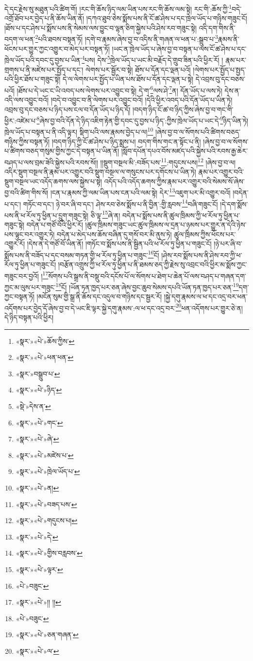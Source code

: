 དེ་དང་རྗེས་སུ་མཐུན་པའི་ཚིག་གོ། །རང་གི་ཆོས་ཉིད་ལམ་ཡིན་པས་རང་གི་ཆོས་ལམ་སྟེ། རང་གི་:ཆོས་ཀྱི་\footnote{«སྣར་»«པེ་»ཆོས་ཀྱིས་}བདེ་འགྲོ་ཐོབ་པར་བྱེད་པ་ནི་ཆོས་ཡིན་ནོ། །དཀའ་ཐུབ་ཅེས་སྨོས་པས་ནི་ངོ་ཚ་ཤེས་པ་དང་ཁྲེལ་ཡོད་པ་གཉིས་གཟུང་ངོ། །ཐོས་པ་དང་ཤེས་པ་སྨོས་པས་ནི་སེམས་ལས་བྱུང་བ་ལྷན་ཅིག་སྐྱེས་པའི་ཤེས་རབ་གཟུང་སྟེ། འདི་དག་གིས་ནི་བདག་ལ་ཕན་\footnote{«སྣར་»«པེ་»ཕན་ཕན་}པའི་ཐབས་བསྟན་ཏོ། །དགེ་བ་རྣམས་ཞེས་བྱ་བ་འདིས་ནི་གཞན་ལ་ཕན་པ་:སྒྲུབ་པ་\footnote{«སྣར་»བསྒྲུབ་པ་}རྣམས་ནི་ཕོངས་པར་གྱུར་ཀྱང་འགྱུར་བ་མེད་པར་བསྟན་ཏོ། །ཡང་ན་ཁྲེལ་ཡོད་པ་ཞེས་བྱ་བ་བསྟན་པ་ལས་ངོ་ཚ་ཤེས་པ་དང་ཁྲེལ་ཡོད་པའི་དབང་དུ་བྱས་པ་ཡིན་\footnote{«སྣར་»«པེ་»ཉིད་}པས། དེས་\footnote{«སྡེ་»དེས་ན་}ཁྲེལ་ཡོད་པ་ཡང་མི་བརྗོད་དེ་གྲུབ་ཟིན་པའི་ཕྱིར་རོ། །
རྣམ་པར་གྲགས་པ་ནི་མཛེས་པར་སྤྱོད་པ་དང་། ལེགས་པར་སྦྱོར་བ་སྟེ། ཐོས་པ་དོན་དང་ལྡན་པའོ། །ལེགས་པར་སྤྱོད་པ་སྤྱད་པའི་ཕྱིར་ཐོས་པ་གཟུང་སྟེ། དེ་ལ་ལེགས་པར་སྤྱོད་པ་ཡིན་པས་ཐོས་པ་དོན་དང་ལྡན་པ་སྟེ། དེ་འབྲས་བུ་དང་བཅས་པའོ། །ཐོས་པ་དེ་ཡང་ང་ཡི་འབད་པས་ལེགས་པར་འབྱུང་བ་སྟེ། དེ་ག་\footnote{«སྣར་»«པེ་»གང་}ལས་ཤེ་\footnote{«སྣར་»«པེ་»ཞེ་}ན། དོན་ཡོད་པ་ལས་ཏེ། དེས་ན་འདི་ལས་འབྱུང་བའོ། །བདེ་བ་འབྱུང་བ་ནི་ལེགས་པར་འབྱུང་བའོ། །དེའི་ཕྱིར་འབད་པའི་དོན་ཡོད་པ་ཡིན་ཏེ། འབྲས་བུ་དང་བཅས་པ་ཉིད་པས་ངལ་བ་དོན་ཡོད་པ་ཉིད་དོ། །བདག་ཉིད་ངོ་ཚ་བ་ཉིད་ཀྱིས་ཞེས་བྱ་བ་གང་གི་ཕྱིར་:འཛེམ་པ་\footnote{«སྣར་»«པེ་»མཛེས་པ་}ཞེས་བྱ་བའི་དོན་དེ་ཉིད་འཇིག་རྟེན་གྱི་དབང་དུ་བྱས་པ་ཉིད་:ཀྱིས་ཁྲེལ་ཡོད་པ་ཡང་དེ་\footnote{«སྣར་»«པེ་»ཁྲེལ་ཡོད་པ་}ཉིད་ཡིན་ཏེ། ཁྲེལ་ཡོད་པ་བསྟན་པ་ནི་འདི་ལྟར། སྡིག་པའི་ལས་རྣམས་བྱེད་པ་ལ།\footnote{«སྣར་»«པེ་»ན།} །ཞེས་བྱ་བ་ལ་སོགས་པའི་ཚིགས་བཅད་གཉིས་ཀྱིས་བསྟན་ཏོ། །བདག་ཉིད་ཀྱི་ངོ་ཚ་ཤེས་པ་ཉིད་སྨྲས་པ། བདག་གིས་གང་ན་སྟོང་པ་ནི། །ཞེས་བྱ་བ་ལ་སོགས་པ་ཚིགས་བཅད་གསུམ་གྱིས་ཀྱང་དེ་བསྟན་པ་ཡིན་ནོ། །སློབ་དཔོན་དཔའ་བོས་མཛད་པའི་སྐྱེས་པའི་རབས་རྒྱ་ཆེར་བཤད་པ་ལས་བྲམ་ཟེའི་སྐྱེས་པའི་རབས་སོ།། །།སྡུག་བསྔལ་མི་:བཟོད་པས་\footnote{«སྣར་»«པེ་»བཟད་པས་}:གདུངས་པས།\footnote{«སྣར་»«པེ་»གདུངས་པ།} །ཞེས་བྱ་བ་ལ། འདིར་སྡུག་བསྔལ་ནི་རྣམ་པར་འགྱུར་བའི་སྡུག་བསྔལ་ལ་གསུངས་པར་དགོངས་པ་ཡིན་ཏེ། རྣམ་པར་འགྱུར་བའི་སྡུག་བསྔལ་ཡང་འདོད་ཆགས་ལས་སྐྱེས་པ་སྟེ། འདོད་པའི་འདོད་ཆགས་ཀྱིས་རྣམ་པར་འགྱུར་བའི་སེམས་སོ་ཞེས་བྱ་བའི་ཚིག་གིས་སོ། །ངན་པ་རྣམས་ཀྱི་ལམ་ཡིན་པས་ངན་པའི་ལམ་སྟེ། དེར་\footnote{«སྣར་»«པེ་»དེ་}འཇུག་པར་མི་འགྱུར་བའོ། །བདེན་པ་དང་། གཏོང་བ་དང་། ཉེ་བར་ཞི་བ་དང་། ཤེས་རབ་ཅེས་སྨོས་པ་ནི་བྱིན་:གྱི་རླབས་\footnote{«སྣར་»«པེ་»གྱིས་བརླབས་}བཞི་གཟུང་ངོ། །དེ་དག་སྨོས་པས་ནི་ཕ་རོལ་ཏུ་ཕྱིན་པ་དྲུག་གཟུང་སྟེ། ཅི་ལྟ་\footnote{«སྣར་»«པེ་»ལྟར་}ཞེ་ན། བདེན་པ་སྨོས་པས་ནི་ཚུལ་ཁྲིམས་ཀྱི་ཕ་རོལ་ཏུ་ཕྱིན་པ་གཟུང་སྟེ། བདེན་པ་གཙོ་བོའི་ཕྱིར་རོ། །ཚུལ་ཁྲིམས་གཟུང་ཡང་ཚུལ་ཁྲིམས་ལ་དྲན་པ་ཉམས་པར་གྱུར་ན་དེའི་ཉེས་པས་ལྟུང་བར་འགྱུར་ཏེ། བདེན་པ་མེད་པས་ཆོས་བཞིན་དུ་གསོ་བར་མི་ནུས་ཏེ། ཚུལ་ཁྲིམས་ཀྱིས་ཕོངས་པར་འགྱུར་རོ། །དེས་ན་དེ་གཙོ་བོ་ཡིན་ནོ། །གཏོང་བ་སྨོས་པས་ནི་སྦྱིན་པའི་ཕ་རོལ་ཏུ་ཕྱིན་པ་གཟུང་ངོ། །ཉེ་པར་ཞི་བ་སྨོས་པས་ནི་བཟོད་པ་དང་བསམ་གཏན་གྱི་ཕ་རོལ་ཏུ་ཕྱིན་པ་གཟུང་\footnote{«པེ་»བཟུང་}ངོ། །ཤེས་རབ་སྨོས་པས་ནི་ཤེས་རབ་ཀྱི་ཕ་རོལ་ཏུ་ཕྱིན་པ་གཟུང་ངོ། །བརྩོན་འགྲུས་ཀྱི་ཕ་རོལ་ཏུ་ཕྱིན་པ་ནི་ཐམས་ཅད་ཀྱི་རྗེས་སུ་འབྲང་བའི་ཕྱིར་མ་སྨོས་ཀྱང་གཟུང་བར་བྱའོ། །\footnote{«སྣར་»«པེ་»།། །།}སོགས་པའི་སྒྲས་ནི་བསྡུ་བའི་དངོས་པོ་ལ་སོགས་པ་ཐེག་པ་ཆེན་པོ་ལས་བཤད་པ་གཞན་དག་ཀྱང་མ་ལུས་པར་གཟུང་\footnote{«པེ་»བཟུང་}ངོ། །ཡོན་ཏན་ཁྱད་པར་ཅན་ཞེས་བྱང་ཆུབ་སེམས་དཔའི་ཡོན་ཏན་ཁྱད་པར་ཅན་\footnote{«སྣར་»«པེ་»ཅན་གཞན་}དག་ཀྱང་བསྟན་ཏོ། །མངོན་སུམ་གྱི་སྒྲ་ནི་ཆོས་དང་འདུལ་བ་གཉིས་དང་སྦྱར་རོ། །སྐྱེ་དགུ་རྣམས་ལ་ཕ་དང་འདྲ་བར་ཕན་འདོགས་པར་བྱེད་དོ་ཞེས་བྱ་བ་དེ་ཡང་ཇི་ལྟར་སྐྱེ་དགུ་རྣམས་:ལ་ཕ་དང་འདྲ་བར་\footnote{«སྣར་»«པེ་»ལ་}ཕན་འདོགས་པར་གྱུར་ཅེ་ན། དེ་ཉིད་བསྟན་པའི་ཕྱིར། 